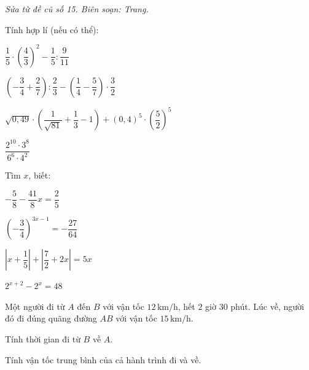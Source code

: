 \noindent\textit{Sửa từ đề cũ số 15. Biên soạn: Trang.}

\begin{bt}[2,0 điểm]
Tính hợp lí (nếu có thể):
\begin{listEX}[1]
\item $\dfrac{1}{5}\cdot\left(\dfrac{4}{3}\right)^{2}-\dfrac{1}{5}:\dfrac{9}{11}$
\item $\left(-\dfrac{3}{4}+\dfrac{2}{7}\right):\dfrac{2}{3}-\left(\dfrac{1}{4}-\dfrac{5}{7}\right)\cdot\dfrac{3}{2}$
\item $\sqrt{0{,}49}\cdot\left(\dfrac{1}{\sqrt{81}}+\dfrac{1}{3}-1\right)+(0{,}4)^{5}\cdot\left(\dfrac{5}{2}\right)^{5}$
\item $\dfrac{2^{10}\cdot 3^{8}}{6^{6}\cdot 4^{2}}$
\end{listEX}
\end{bt}

\begin{bt}[2,0 điểm]
Tìm $x$, biết:
\begin{listEX}[2]
\item $-\dfrac{5}{8}-\dfrac{41}{8}x=\dfrac{2}{5}$
\item $\left(-\dfrac{3}{4}\right)^{3x-1}=-\dfrac{27}{64}$
\item $\left|x+\dfrac{1}{5}\right|+\left|\dfrac{7}{2}+2x\right|=5x$
\item $2^{x+2}-2^{x}=48$
\end{listEX}
\end{bt}

\begin{bt}[1,0 điểm]
Một người đi từ $A$ đến $B$ với vận tốc $12\,\mathrm{km/h}$, hết $2$ giờ $30$ phút. Lúc về, người đó đi đúng quãng đường $AB$ với vận tốc $15\,\mathrm{km/h}$.
\begin{listEX}[1]
\item Tính thời gian đi từ $B$ về $A$.
\item Tính vận tốc trung bình của cả hành trình đi và về.
\end{listEX}
\end{bt}

